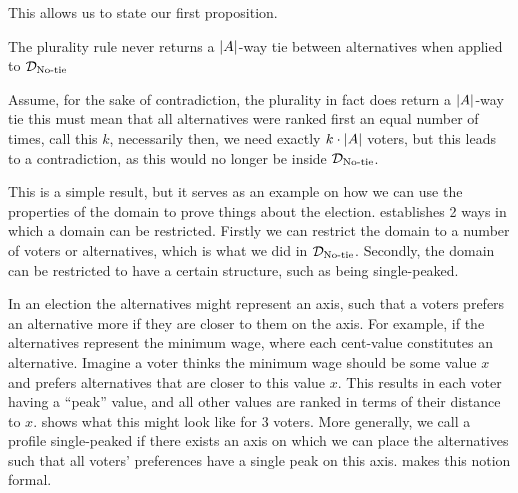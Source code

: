 This allows us to state our first proposition.

\begin{proposition}
	The plurality rule never returns a $|A|$-way tie between alternatives when applied to $\mathcal{D}_{\textnormal{No-tie}}$
\end{proposition}

\begin{proofc}
	Assume, for the sake of contradiction, the plurality in fact does
	return a $|A|$-way tie this must mean that all alternatives were ranked first an
	equal number of times, call this $k$, necessarily then, we need
	exactly $k \cdot |A|$ voters, but this leads to a
	contradiction, as this would no longer be inside $\mathcal{D}_{\textnormal{No-tie}}$.
\end{proofc}

This is a simple result, but it serves as an example on how we can use the properties of the domain to prove things about the election. \citet{gaertnerDomainRestrictions2002} establishes 2 ways in which a domain can be restricted. Firstly we can restrict the domain to a number of voters or alternatives, which is what we did in $\mathcal{D}_{\textnormal{No-tie}}$. Secondly, the domain can be restricted to have a certain structure, such as being single-peaked.


In an election the alternatives might represent an axis, such that a voters
prefers an alternative more if they are closer to them on the axis. For
example, if the alternatives represent the minimum wage, where each cent-value
constitutes an alternative. Imagine a voter thinks the minimum wage should  be
some value $x$ and prefers alternatives that are closer to this value $x$. This
results in each voter having a ``peak'' value, and all other values are ranked
in terms of their distance to $x$.  shows what this
might look like for 3 voters. More generally, we call a profile single-peaked
if there exists an axis on which we can place the alternatives such that all
voters' preferences have a single peak on this axis. 
makes this notion formal.

